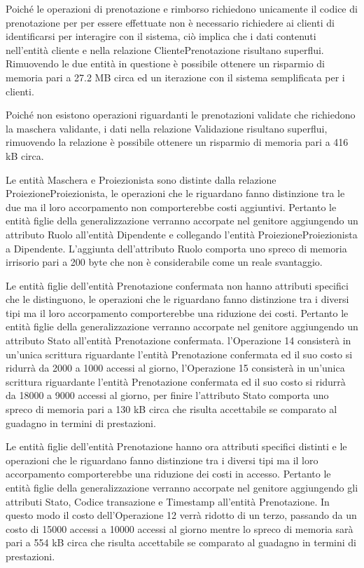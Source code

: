 Poiché le operazioni di prenotazione e rimborso richiedono unicamente il codice
di prenotazione per per essere effettuate non è necessario richiedere ai clienti
di identificarsi per interagire con il sistema, ciò implica che i dati
contenuti nell'entità cliente e nella relazione ClientePrenotazione risultano
superflui. Rimuovendo le due entità in questione è possibile ottenere un
risparmio di memoria pari a %
27.2 MB circa ed un iterazione con il sistema semplificata per i clienti.

Poiché non esistono operazioni riguardanti le prenotazioni validate che
richiedono la maschera validante, i dati nella relazione Validazione risultano
superflui, rimuovendo la relazione è possibile ottenere un risparmio di memoria
pari a %
416 kB circa.

Le entità Maschera e Proiezionista sono distinte dalla relazione
ProiezioneProiezionista, le operazioni che le riguardano fanno distinzione tra
le due ma il loro accorpamento non comporterebbe costi aggiuntivi.
Pertanto le entità figlie della generalizzazione verranno accorpate nel
genitore aggiungendo un attributo Ruolo all'entità Dipendente e collegando
l'entità ProiezioneProiezionista a Dipendente.
L'aggiunta dell'attributo Ruolo comporta uno spreco di memoria irrisorio pari a
200 byte che non è considerabile come un reale svantaggio.


Le entità figlie dell'entità Prenotazione confermata non hanno attributi
specifici che le distinguono, le operazioni che le riguardano fanno distinzione 
tra i diversi tipi ma il loro accorpamento comporterebbe una riduzione dei
costi.
Pertanto le entità figlie della generalizzazione verranno accorpate nel
genitore aggiungendo un attributo Stato all'entità Prenotazione confermata.
l'Operazione 14 consisterà in un'unica scrittura riguardante
l'entità Prenotazione confermata ed il suo costo si ridurrà da 2000 a 1000
accessi al giorno,
l'Operazione 15 consisterà in un'unica scrittura riguardante
l'entità Prenotazione confermata ed il suo costo si ridurrà da 18000 a 9000
accessi al giorno,
per finire l'attributo Stato comporta uno spreco di memoria pari a
130 kB circa che risulta accettabile se comparato al guadagno in termini di
prestazioni.

Le entità figlie dell'entità Prenotazione hanno ora attributi specifici 
distinti e le operazioni che le riguardano fanno distinzione tra i diversi
tipi ma il loro accorpamento comporterebbe una riduzione dei costi in accesso.
Pertanto le entità figlie della generalizzazione verranno accorpate nel
genitore aggiungendo gli attributi Stato, Codice transazione e Timestamp
all'entità Prenotazione.
In questo modo il costo dell'Operazione 12 verrà ridotto di un terzo,
passando da un costo di 15000 accessi a 10000 accessi al giorno mentre
lo spreco di memoria sarà pari a
554 kB circa che risulta accettabile se comparato al guadagno in termini di
prestazioni.

